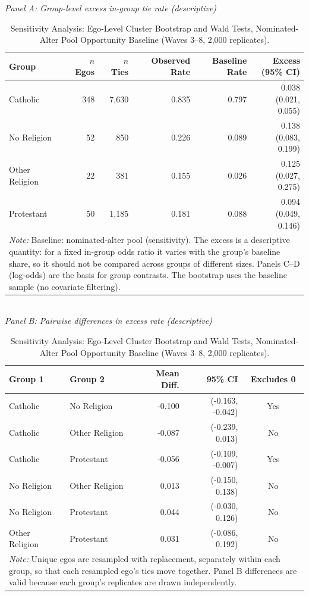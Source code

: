 \begin{table}[htbp]
\caption{\label{tab:bootstrap-sensitivity-pool}Sensitivity Analysis: Ego-Level Cluster Bootstrap and Wald Tests, Nominated-Alter Pool Opportunity Baseline (Waves 3--8, 2,000 replicates).}
\centering
\scriptsize
\textit{Panel A: Group-level excess in-group tie rate (descriptive)}\\[2pt]
\begin{tabular}{lrrrrr}
\toprule
Group & $n$ Egos & $n$ Ties & Observed Rate & Baseline Rate & Excess (95\% CI) \\
\midrule
Catholic & 348 & 7,630 & 0.835 & 0.797 & 0.038 (0.021, 0.055) \\
No Religion & 52 & 850 & 0.226 & 0.089 & 0.138 (0.083, 0.199) \\
Other Religion & 22 & 381 & 0.155 & 0.026 & 0.125 (0.027, 0.275) \\
Protestant & 50 & 1,185 & 0.181 & 0.088 & 0.094 (0.049, 0.146) \\
\bottomrule
\multicolumn{6}{p{0.95\textwidth}}{\footnotesize \textit{Note:} Baseline: nominated-alter pool (sensitivity). The excess is a descriptive quantity: for a fixed in-group odds ratio it varies with the group's baseline share, so it should not be compared across groups of different sizes. Panels C--D (log-odds) are the basis for group contrasts. The bootstrap uses the baseline sample (no covariate filtering).} \\
\end{tabular}
\\[8pt]
\textit{Panel B: Pairwise differences in excess rate (descriptive)}\\[2pt]
\begin{tabular}{llrrc}
\toprule
Group 1 & Group 2 & Mean Diff. & 95\% CI & Excludes 0 \\
\midrule
Catholic & No Religion & -0.100 & (-0.163, -0.042) & Yes \\
Catholic & Other Religion & -0.087 & (-0.239, 0.013) & No \\
Catholic & Protestant & -0.056 & (-0.109, -0.007) & Yes \\
No Religion & Other Religion & 0.013 & (-0.150, 0.138) & No \\
No Religion & Protestant & 0.044 & (-0.030, 0.126) & No \\
Other Religion & Protestant & 0.031 & (-0.086, 0.192) & No \\
\bottomrule
\multicolumn{5}{p{0.95\textwidth}}{\footnotesize \textit{Note:} Unique egos are resampled with replacement, separately within each group, so that each resampled ego's ties move together. Panel B differences are valid because each group's replicates are drawn independently.} \\

\end{tabular}
\end{table}
